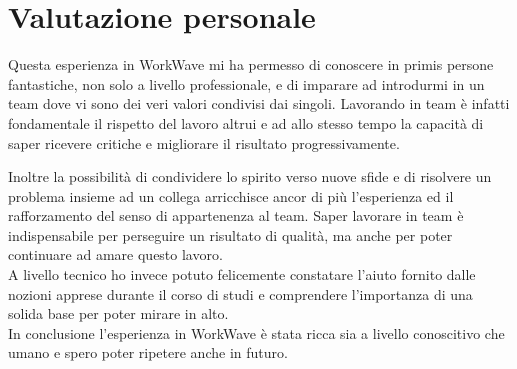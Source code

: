 \section{Valutazione personale}

Questa esperienza in WorkWave mi ha permesso di conoscere in primis persone fantastiche, non solo a livello professionale, e di imparare ad introdurmi in un team dove vi sono dei veri valori condivisi dai singoli. Lavorando in team è infatti fondamentale il rispetto del lavoro altrui e ad allo stesso tempo la capacità di saper ricevere critiche e migliorare il risultato progressivamente.

Inoltre la possibilità di condividere lo spirito verso nuove sfide e di risolvere un problema insieme ad un collega arricchisce ancor di più l'esperienza ed il rafforzamento del senso di appartenenza al team. Saper lavorare in team è indispensabile per perseguire un risultato di qualità, ma anche per poter continuare ad amare questo lavoro. \\

A livello tecnico ho invece potuto felicemente constatare l'aiuto fornito dalle nozioni apprese durante il corso di studi e comprendere l'importanza di una solida base per poter mirare in alto. \\

In conclusione l'esperienza in WorkWave è stata ricca sia a livello conoscitivo che umano e spero poter ripetere anche in futuro.
